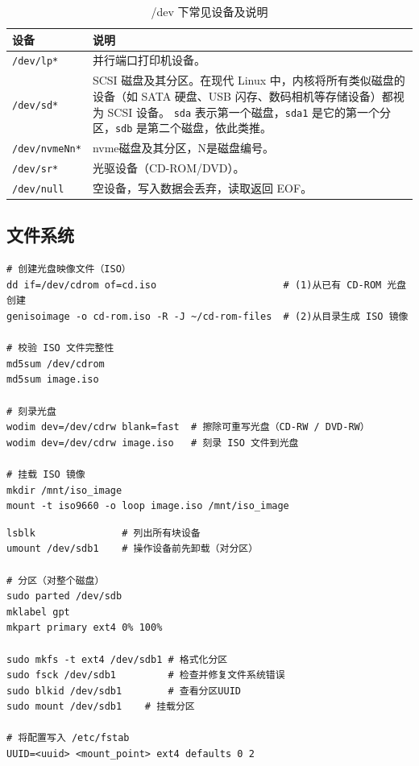 \begin{table}[H]
	\centering
	\begin{tabular}{|l|p{12cm}|}
		\hline
		\textbf{设备}         & \textbf{说明}                                                                  \\
		\hline
		\verb|/dev/lp*|     & 并行端口打印机设备。                                                                   \\
		\hline
		\verb|/dev/sd*|     & SCSI 磁盘及其分区。在现代 Linux 中，内核将所有类似磁盘的设备（如 SATA 硬盘、USB 闪存、数码相机等存储设备）都视为 SCSI 设备。
		\verb|sda| 表示第一个磁盘，\verb|sda1| 是它的第一个分区，\verb|sdb| 是第二个磁盘，依此类推。                                    \\
		\hline
		\verb|/dev/nvmeNn*| & nvme磁盘及其分区，N是磁盘编号。                                                           \\
		\hline
		\verb|/dev/sr*|     & 光驱设备（CD-ROM/DVD）。                                                            \\
		\hline
		\verb|/dev/null|    & 空设备，写入数据会丢弃，读取返回 EOF。                                                        \\
		\hline
	\end{tabular}
	\caption{/dev 下常见设备及说明}
\end{table}

\subsection{文件系统}

\begin{code}[title=ISO Image]
	\begin{verbatim}
# 创建光盘映像文件（ISO）
dd if=/dev/cdrom of=cd.iso						# (1)从已有 CD-ROM 光盘创建
genisoimage -o cd-rom.iso -R -J ~/cd-rom-files	# (2)从目录生成 ISO 镜像

# 校验 ISO 文件完整性
md5sum /dev/cdrom
md5sum image.iso

# 刻录光盘
wodim dev=/dev/cdrw blank=fast	# 擦除可重写光盘（CD-RW / DVD-RW）
wodim dev=/dev/cdrw image.iso	# 刻录 ISO 文件到光盘

# 挂载 ISO 镜像
mkdir /mnt/iso_image
mount -t iso9660 -o loop image.iso /mnt/iso_image
\end{verbatim}
\end{code}

\begin{code}[title=Disk Partitioning]
	\begin{verbatim}
lsblk				# 列出所有块设备
umount /dev/sdb1	# 操作设备前先卸载（对分区）

# 分区（对整个磁盘）
sudo parted /dev/sdb
mklabel gpt
mkpart primary ext4 0% 100%

sudo mkfs -t ext4 /dev/sdb1	# 格式化分区
sudo fsck /dev/sdb1			# 检查并修复文件系统错误
sudo blkid /dev/sdb1		# 查看分区UUID
sudo mount /dev/sdb1 	# 挂载分区

# 将配置写入 /etc/fstab
UUID=<uuid> <mount_point> ext4 defaults 0 2
\end{verbatim}
\end{code}

